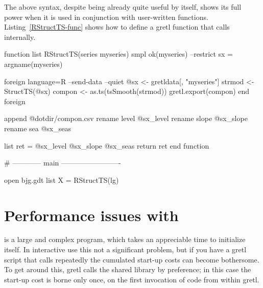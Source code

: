 \begin{script}[htbp]
  \label{RStructTS-simple}
\end{script}

The above syntax, despite being already quite useful by itself, shows
its full power when it is used in conjunction with user-written
functions.  Listing~\ref{RStructTS-func} shows how to define a
gretl function that calls  internally.

\begin{script}[htbp]
  \label{RStructTS-func}
\begin{scode}
function list RStructTS(series myseries)
    smpl ok(myseries) --restrict
    sx = argname(myseries)

    foreign language=R --send-data --quiet
        @sx <- gretldata[, "myseries"]
        strmod <- StructTS(@sx)
        compon <- as.ts(tsSmooth(strmod))
        gretl.export(compon)
    end foreign

    append @dotdir/compon.csv
    rename level @sx_level
    rename slope @sx_slope
    rename sea @sx_seas

    list ret = @sx_level @sx_slope @sx_seas
    return ret
end function

# ------------ main -------------------------

open bjg.gdt
list X = RStructTS(lg)
\end{scode}
\end{script}

\section{Performance issues with }
\label{sec:R-performance}

 is a large and complex program, which takes an appreciable
time to initialize itself.  In interactive use this not a significant
problem, but if you have a gretl script that calls  repeatedly
the cumulated start-up costs can become bothersome.  To get around
this, gretl calls the  shared library by preference; in this
case the start-up cost is borne only once, on the first invocation of
 code from within gretl.

